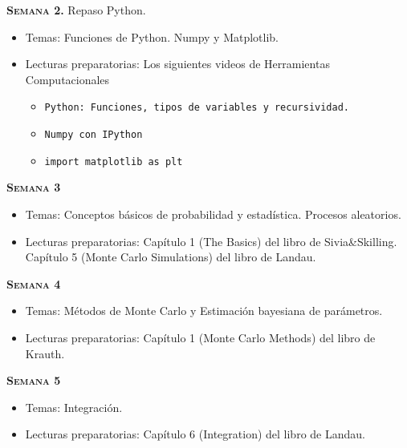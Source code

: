 \documentclass[letterpaper,10pt,onecolumn]{article}
\begin{document}
\noindent\textbf{\textsc{Semana 2.}} Repaso Python. \\[-0.5cm]
\begin{itemize}
\item Temas: 
Funciones de Python. Numpy y Matplotlib.\\[-0.6cm] 
\item Lecturas preparatorias: Los siguientes videos de Herramientas Computacionales

\begin{itemize}
\item \texttt{Python: Funciones, tipos de variables y recursividad.}
\item \texttt{Numpy con IPython}
\item \texttt{import matplotlib as plt}
\end{itemize}
\end{itemize}

\noindent\textbf{\textsc{Semana 3}}\\[-0.5cm]
\begin{itemize}
\item Temas: Conceptos b\'asicos de
  probabilidad y estad\'istica. Procesos aleatorios. \\[-0.6cm]  
\item Lecturas preparatorias: Cap\'itulo 1 (The Basics) del libro de
  Sivia\&Skilling. Cap\'itulo 5 (Monte Carlo Simulations) del libro de Landau.\\[-0.6cm]
\end{itemize}

\noindent\textbf{\textsc{Semana 4}}\\[-0.5cm]
\begin{itemize}
\item Temas: M\'etodos de Monte Carlo y Estimaci\'on bayesiana de par\'ametros. \\[-0.6cm]
\item Lecturas preparatorias: Cap\'itulo 1 (Monte Carlo Methods) del
  libro de Krauth.\\[-0.6cm]
\end{itemize}

\noindent\textbf{\textsc{Semana 5}}\\[-0.5cm]
\begin{itemize}
\item Temas: Integraci\'on. \\[-0.6cm]
\item Lecturas preparatorias: Cap\'itulo 6 (Integration) del libro de
Landau.\\[-0.6cm]
\end{itemize}
\end{document}
